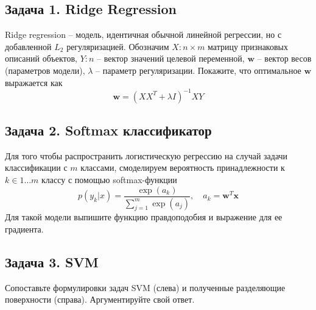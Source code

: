 \documentclass[12pt,a4paper]{article}
\author{Николай Анохин}
\begin{document}
\subsection*{Задача 1. Ridge Regression} 

Ridge regression -- модель, идентичная обычной линейной регрессии, но с добавленной $L_2$ регуляризацией. Обозначим $X: n \times m$ матрицу признаковых описаний объектов,  $Y: n$ --  вектор значений целевой переменной,  $\mathbf{w}$ -- вектор весов (параметров модели), $\lambda$ -- параметр регуляризации. Покажите, что оптимальное $\mathbf{w}$ выражается как
\[
\mathbf{w} = (X X^T + \lambda I)^{-1} X Y
\]

\subsection*{Задача 2. Softmax классификатор}

Для того чтобы распространить логистическую регрессию на случай задачи классификации с $m$ классами, смоделируем вероятность принадлежности к $k \in 1 \ldots m$ классу с помощью softmax-функции
\[
p(y_k | x) = \frac{\exp(a_k)}{\sum_{j=1}^m\exp(a_j)}, \quad a_k = \mathbf{w}^T \mathbf{x}
\]
Для такой модели выпишите функцию правдоподобия и выражение для ее градиента.

\subsection*{Задача 3. SVM}

Сопоставьте формулировки задач SVM (слева) и полученные разделяющие поверхности (справа). Аргументируйте свой ответ.
\end{document}
